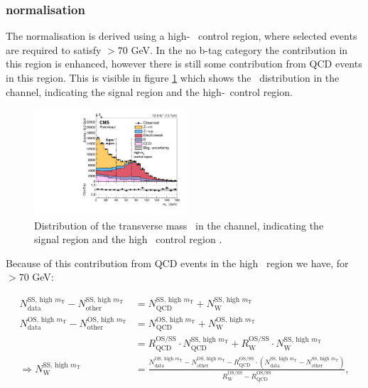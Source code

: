 \subsubsection{\texorpdfstring{\Wjets normalisation}{W+jets normalisation}}
\label{sec:mssm_bkgs_mtet_wjetsnorm}
The \Wjets normalisation is derived using a high-\mT~ control region, where
selected events are required to satisfy \mT$>70$ GeV. In the no b-tag
category the \Wjets
contribution in this region is enhanced, however there is still
some contribution from QCD events in this region. This is visible in 
figure \ref{fig:mssm_bkgs_wjets_mutau_mt} which shows the \mT~distribution in the
\mutau channel, indicating the signal region and the high-\mT~control region. 

\begin{figure}[h!]
\begin{center}
\includegraphics[width=0.5\textwidth]{./MSSM/Figures/CMS-PAS-HIG-16-037_Figure_002.pdf}
\end{center}
\caption{Distribution of the transverse mass \mT~in the \mutau channel, indicating
the signal region and the high \mT~control region \cite{CMS-PAS-HIG-16-037}.}
\label{fig:mssm_bkgs_wjets_mutau_mt}
\end{figure}

Because of this contribution from QCD events in the high \mT~region we
have, for \mT$>70$ GeV:

\begin{equation}\label{eqn:wjets_ss_norm}
\begin{split}
N_{\text{data}}^{\text{SS, high } m_{\text{T}}} - N_{\text{other}}^{\text{SS,
 high } m_{\text{T}}} & =
N_{\text{QCD}}^{\text{SS, high } m_{\text{T}}} + N_{\text{W}}^{\text{SS, high } m_{\text{T}}} ~\\
N_{\text{data}}^{\text{OS, high } m_{\text{T}}} - N_{\text{other}}^{\text{OS,
 high } m_{\text{T}}} & = N_{\text{QCD}}^{\text{OS, high } m_{\text{T}}} +
N_{\text{W}}^{\text{OS, high } m_{\text{T}}} \\
& = R_{\text{QCD}}^{\text{OS/SS}}\cdot N_{\text{QCD}}^{\text{SS, high } m_{\text{T}}} +
R_{\text{W}}^{\text{OS/SS}} \cdot N_{\text{W}}^{\text{SS, high } m_{\text{T}}} ~\\
\Rightarrow N_{\text{W}}^{\text{SS, high } m_{\text{T}}}  &= \frac{N_{\text{data}}^{\text{OS,
 high } m_{\text{T}}}  - N_{\text{other}}^{\text{OS, high } m_{\text{T}}}  -
R_{\text{QCD}}^{\text{OS/SS}}\cdot(N_{\text{data}}^{\text{SS, high } m_{\text{T}}}  -
N_{\text{other}}^{\text{SS, high } m_{\text{T}}} )}{R_{\text{W}}^{\text{OS/SS}} -
R_{\text{QCD}}^{\text{OS/SS}}} ,
\end{split}
\end{equation}

